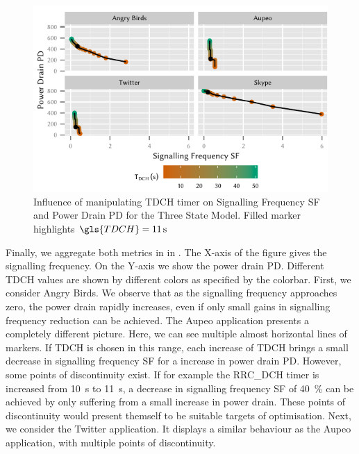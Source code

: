 \begin{figure}
	\centering
	\includegraphics{network/network_traces/numerical_results/figures/3_state_signalling_vs_power_consumption}
	\caption{Influence of manipulating \gls{TDCH} timer on Signalling Frequency \gls{SF} and Power Drain \gls{PD} for the Three State Model. Filled marker highlights \(\gls{TDCH} = \SI{11}{\second}\)}\label{fig:network:network_traces:numerical_results:three_states:trade_off}
\end{figure}
Finally, we aggregate both metrics in in .
The X-axis of the figure gives the signalling frequency.
On the Y-axis we show the power drain \gls{PD}.
Different \gls{TDCH} values are shown by different colors as specified by the colorbar.
First, we consider Angry Birds.
We observe that as the signalling frequency approaches zero, the power drain rapidly increases, even if only small gains in signalling frequency reduction can be achieved.
The Aupeo application presents a completely different picture.
Here, we can see multiple almost horizontal lines of markers.
If \gls{TDCH} is chosen in this range, each increase of \gls{TDCH} brings a small decrease in signalling frequency \gls{SF} for a increase in power drain \gls{PD}.
However, some points of discontinuity exist.
If for example the \gls{RRC_DCH} timer is increased from \SI{10}{\second} to \SI{11}{\second}, a decrease in signalling frequency \gls{SF} of \SI{40}{\percent} can be achieved by only suffering from a small increase in power drain.
These points of discontinuity would present themself to be suitable targets of optimisation.
Next, we consider the Twitter application.
It displays a similar behaviour as the Aupeo application, with multiple points of discontinuity.

